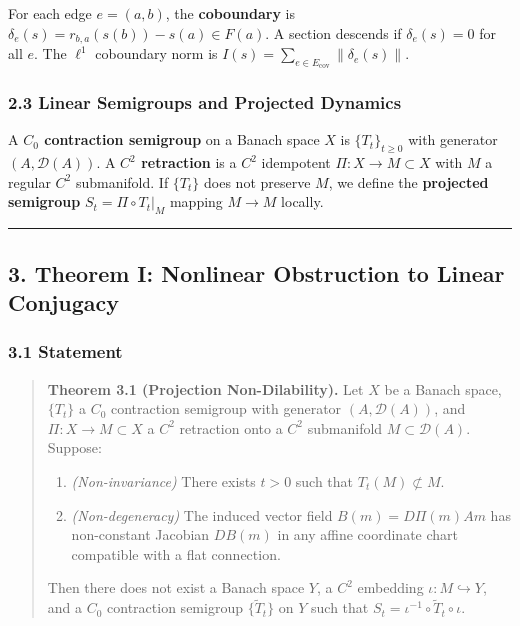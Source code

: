 \documentclass[
]{article}
\begin{document}
For each edge \(e = (a,b)\), the \textbf{coboundary} is
\(\delta_e(s) = r_{b,a}(s(b)) - s(a) \in F(a)\). A section descends if
\(\delta_e(s) = 0\) for all \(e\). The \(\ell^1\) coboundary norm is
\(I(s) = \sum_{e \in E_{\text{cov}}} \|\delta_e(s)\|\).

\subsubsection{2.3 Linear Semigroups and Projected
Dynamics}\label{linear-semigroups-and-projected-dynamics}

A \textbf{\(C_0\) contraction semigroup} on a Banach space \(X\) is
\(\{T_t\}_{t \geq 0}\) with generator \((A, \mathcal{D}(A))\). A
\textbf{\(C^2\) retraction} is a \(C^2\) idempotent
\(\Pi: X \to M \subset X\) with \(M\) a regular \(C^2\) submanifold. If
\(\{T_t\}\) does not preserve \(M\), we define the \textbf{projected
semigroup} \(S_t = \Pi \circ T_t|_M\) mapping \(M \to M\) locally.

\begin{center}\rule{0.5\linewidth}{0.5pt}\end{center}

\subsection{3. Theorem I: Nonlinear Obstruction to Linear
Conjugacy}\label{theorem-i-nonlinear-obstruction-to-linear-conjugacy}

\subsubsection{3.1 Statement}\label{statement}

\begin{quote}
\textbf{Theorem 3.1 (Projection Non-Dilability).} Let \(X\) be a Banach
space, \(\{T_t\}\) a \(C_0\) contraction semigroup with generator
\((A, \mathcal{D}(A))\), and \(\Pi: X \to M \subset X\) a \(C^2\)
retraction onto a \(C^2\) submanifold \(M \subset \mathcal{D}(A)\).
Suppose:

\begin{enumerate}
\def\labelenumi{(\alph{enumi})}
\item
  \emph{(Non-invariance)} There exists \(t > 0\) such that
  \(T_t(M) \not\subset M\).
\item
  \emph{(Non-degeneracy)} The induced vector field \(B(m) = D\Pi(m)Am\)
  has non-constant Jacobian \(DB(m)\) in any affine coordinate chart
  compatible with a flat connection.
\end{enumerate}

Then there does not exist a Banach space \(Y\), a \(C^2\) embedding
\(\iota: M \hookrightarrow Y\), and a \(C_0\) contraction semigroup
\(\{\tilde{T}_t\}\) on \(Y\) such that
\(S_t = \iota^{-1} \circ \tilde{T}_t \circ \iota\).
\end{quote}
\end{document}
